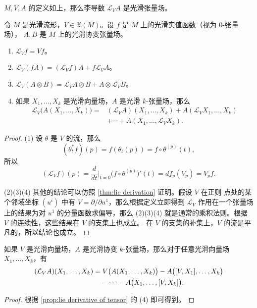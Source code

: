 \begin{lemma}
  $M,V,A$ 的定义如上，那么李导数 $\mathcal L_VA$ 是光滑张量场。
\end{lemma}

\begin{proposition}\label{prop:lie derivative of tensor}
  令 $M$ 是光滑流形，$V\in \mathfrak X(M)$。设 $f$ 是 $M$ 上的光滑实值函数（视为 $0$-张量场），
  $A,B$ 是 $M$ 上的光滑协变张量场。
  \begin{enumerate}
    \item $\mathcal L_Vf=Vf$。
    \item $\mathcal L_V(fA)=(\mathcal L_Vf)A+f\mathcal L_VA$。
    \item $\mathcal L_V(A\otimes B)=\mathcal L_VA\otimes B+A\otimes \mathcal L_VB$。
    \item 如果 $X_1,\dots,X_k$ 是光滑向量场，$A$ 是光滑 $k$-张量场，那么
    \begin{align*}
      \mathcal L_V\bigl(A(X_1,\dots,X_k)\bigr)={}&(\mathcal L_VA)(X_1,\dots,X_k)+A(\mathcal L_VX_1,\dots,X_k)\\
      &+\cdots+ A(X_1,\dots,\mathcal L_VX_k).
    \end{align*}
  \end{enumerate}
\end{proposition}
\begin{proof}
  (1) 设 $\theta$ 是 $V$ 的流，那么
  \[
    (\theta_t^*f)(p)=f(\theta_t(p))=f\circ\theta^{(p)}(t),
  \]
  所以
  \[
    (\mathcal L_Vf)(p)=\frac{d}{dt}\bigg|_{t=0}\bigl(f\circ\theta^{(p)}\bigr)'(t)
    =df_p(V_p)=V_pf.
  \]

  (2)(3)(4) 其他的结论可以仿照 \autoref{thm:lie derivation} 证明。假设 $V$ 在正则
  点处的某个邻域坐标 $(u^i)$ 中有 $V=\partial/\partial u^1$，那么根据定义立即得到
  $\mathcal L_V$ 作用在一个张量场上的结果为对 $u^1$ 的分量函数求偏导，那么
  (2)(3)(4) 就是通常的乘积法则。根据 $V$ 的连续性，这些结果在 $V$ 的支集上也成立。
  在 $V$ 的支集的补集上，$V$ 的流是平凡的，所以结论也成立。
\end{proof}

\begin{corollary}
  如果 $V$ 是光滑向量场，$A$ 是光滑协变 $k$-张量场，那么对于任意光滑向量场
  $X_1,\dots,X_k$，有
  \begin{align}
    (\mathcal L_VA)(X_1,\dots,X_k)&=V\bigl(A(X_1,\dots,X_k)\bigr)-
    A\bigl([V,X_1],\dots,X_k\bigr)\notag\\
    &\phantom{{}=}-\cdots-A\bigl(X_1,\dots,[V,X_k]\bigr).
    \label{eq:formula of lie derivative of tensor}
  \end{align}
\end{corollary}
\begin{proof}
  根据 \autoref{prop:lie derivative of tensor} 的 (4) 即可得到。
\end{proof}

